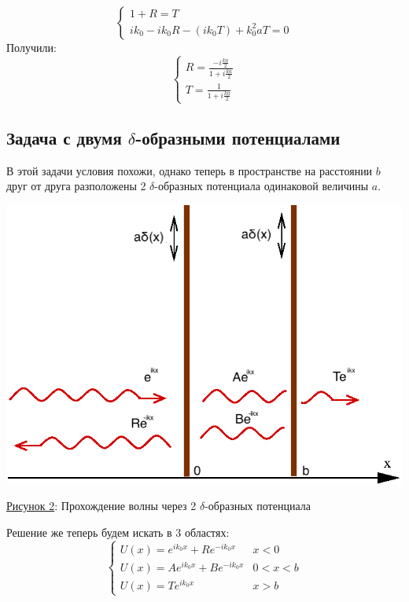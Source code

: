 \documentclass[11pt]{article}    %
\begin{document}
\begin{equation}
    \begin{cases}
        1 + R = T
        \\
        ik_0 - ik_0R - (ik_0T) + k_0^2 a T = 0
    \end{cases}
\end{equation}
Получили:
\begin{equation}
    \begin{cases}
        R = \frac{-i\frac{ka}{2}}{1+i\frac{ka}{2}}
        \\
        T = \frac{1}{1+i\frac{ka}{2}}
    \end{cases}
\end{equation}

\subsection{Задача с двумя $\delta$-образными потенциалами}
В этой задачи условия похожи, однако теперь в пространстве на расстоянии $b$ друг от друга разположены 2 $\delta$-образных потенциала одинаковой величины $a$.
\par
\begin{center}
\includegraphics[scale = 0.55]{Deltapot1.png}
\par
    \underline{Рисунок 2}: Прохождение волны через 2 $\delta$-образных потенциала
\end{center}
\par Решение же теперь будем искать в 3 областях:
\begin{equation}
    \begin{cases}
        U(x) = e^{ik_0x} + Re^{-ik_0x} & x<0
        \\
        U(x) = Ae^{ik_0x} + Be^{-ik_0x} & 0<x<b
        \\
        U(x) = Te^{ik_0x}& x>b
    \end{cases}
\end{equation}
\end{document}
